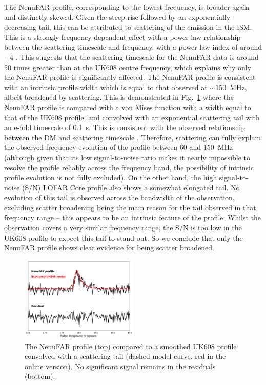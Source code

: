 The NenuFAR profile, corresponding to the lowest frequency, is broader again and distinctly skewed. Given the steep rise followed by an exponentially-decreasing tail, this can be attributed to scattering of the emission in the ISM. This is a strongly frequency-dependent effect with a power-law relationship between the scattering timescale and frequency, with a power law index of around $-4$ \citep{SDOx1980,PulsarAstronomy, GKK+2017}. This suggests that the scattering timescale for the NenuFAR data is around 50 times greater than at the UK608 centre frequency, which explains why only the NenuFAR profile is significantly affected. The NenuFAR profile is consistent with an intrinsic profile width which is equal to that observed at $\sim$150~MHz, albeit broadened by scattering. This is demonstrated in Fig.~\ref{fig: J0250 - nenufar scattering} where the NenuFAR profile is compared with a von Mises function with a width equal to that of the UK608 profile, and convolved with an exponential scattering tail with an e-fold timescale of 0.1~s. This is consistent with the observed relationship between the DM and scattering timescale \citep[e.g.][]{BCC+2004,IJWx2019}. Therefore, scattering can fully explain the observed frequency evolution of the profile between 60 and 150~MHz (although given that its low signal-to-noise ratio makes it nearly impossible to resolve the profile reliably across the frequency band, the possibility of intrinsic profile evolution is not fully excluded). On the other hand, the high signal-to-noise (S/N) LOFAR Core profile also shows a somewhat elongated tail. No evolution of this tail is observed across the bandwidth of the observation, excluding scatter broadening being the main reason for the tail observed in that frequency range -- this appears to be an intrinsic feature of the profile. Whilst the observation covers a very similar frequency range, the S/N is too low in the UK608 profile to expect this tail to stand out. So we conclude that only the NenuFAR profile shows clear evidence for being scatter broadened.
\begin{figure}
    \begin{center}
        \includegraphics[width=0.5\textwidth]{Figures/J0250/nenufar_scattering}
        \caption[Evidence for scattering in the NenuFAR profile of PSR~J0250+5854]{The NenuFAR profile (top) compared to a smoothed UK608 profile convolved with a scattering tail (dashed model curve, red in the online version). No significant signal remains in the residuals (bottom).}
        \label{fig: J0250 - nenufar scattering}
    \end{center}
\end{figure}


